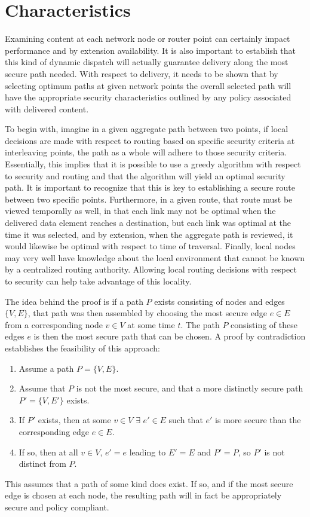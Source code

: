 \section{Characteristics}
\label{section:characteristics}
Examining content at each network node or router point can certainly impact performance and by extension availability.  It is also important to establish that this kind of dynamic dispatch will actually guarantee delivery along the most secure path needed.  With respect to delivery, it needs to be shown that by selecting optimum paths at given network points the overall selected path will have the appropriate security characteristics outlined by any policy associated with delivered content.

To begin with, imagine in a given aggregate path between two points, if local decisions are made with respect to routing based on specific security criteria at interleaving points, the path as a whole will adhere to those security criteria.  Essentially, this implies that it is possible to use a greedy algorithm with respect to security and routing and that the algorithm will yield an optimal security path.  It is important to recognize that this is key to establishing a secure route between two specific points.  Furthermore, in a given route, that route must be viewed temporally as well, in that each link may not be optimal when the delivered data element reaches a destination, but each link was optimal at the time it was selected, and by extension, when the aggregate path is reviewed, it would likewise be optimal with respect to time of traversal.  Finally, local nodes may very well have knowledge about the local environment that cannot be known by a centralized routing authority.  Allowing local routing decisions with respect to security can help take advantage of this locality.

The idea behind the proof is if a path $P$ exists consisting of nodes and edges $\lbrace V, E \rbrace$, that path was then assembled by choosing the most secure edge $e \in E$ from a corresponding node $v \in V$ at some time $t$.  The path $P$ consisting of these edges $e$ is then the most secure path that can be chosen.  A proof by contradiction establishes the feasibility of this approach:

\begin{enumerate}
\item Assume a path $P = \lbrace V, E \rbrace$.
\item Assume that $P$ is not the most secure, and that a more distinctly secure path $P' = \lbrace V, E' \rbrace$ exists.
\item If $P'$ exists, then at some $v \in V$ $\exists$ $e' \in E$ such that $e'$ is more secure than the corresponding edge $e \in E$.
\item If so, then at all $v \in V$, $e' = e$ leading to $E' = E$ and $P' = P$, so $P'$ is not distinct from $P$. 
\end{enumerate}

This assumes that a path of some kind does exist.  If so, and if the most secure edge is chosen at each node, the resulting path will in fact be appropriately secure and policy compliant.